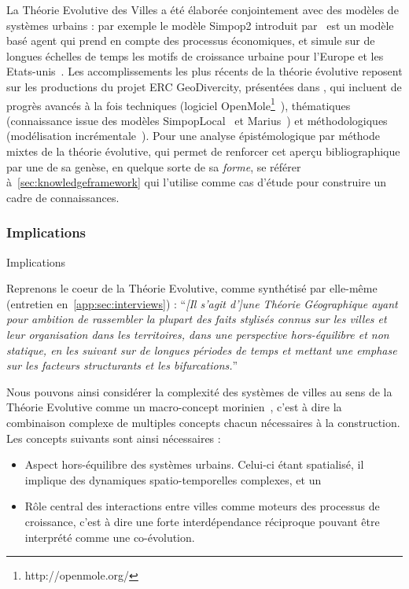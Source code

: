 La Théorie Evolutive des Villes a été élaborée conjointement avec des modèles de systèmes urbains : par exemple le modèle Simpop2 introduit par~\cite{bretagnolle2006theory} est un modèle basé agent qui prend en compte des processus économiques, et simule sur de longues échelles de temps les motifs de croissance urbaine pour l'Europe et les Etats-unis~\cite{doi:10.1177/0042098010377366}. Les accomplissements les plus récents de la théorie évolutive reposent sur les productions du projet ERC GeoDivercity, présentées dans \cite{pumain2017urban}, qui incluent de progrès avancés à la fois techniques (logiciel OpenMole\footnote{http://openmole.org/}~\cite{reuillon2013openmole}), thématiques (connaissance issue des modèles SimpopLocal~\cite{schmitt2014modelisation} et Marius~\cite{cottineau2014evolution}) et méthodologiques (modélisation incrémentale~\cite{cottineau2015incremental}). Pour une analyse épistémologique par méthode mixtes de la théorie évolutive, qui permet de renforcer cet aperçu bibliographique par une de sa genèse, en quelque sorte de sa \emph{forme}, se référer à~\ref{sec:knowledgeframework} qui l'utilise comme cas d'étude pour construire un cadre de connaissances.



\subsubsection*{Implications}{Implications}


Reprenons le coeur de la Théorie Evolutive, comme synthétisé par  elle-même (entretien en~\ref{app:sec:interviews}) : ``\textit{[Il s'agit d']une Théorie Géographique ayant pour ambition de rassembler la plupart des faits stylisés connus sur les villes et leur organisation dans les territoires, dans une perspective hors-équilibre et non statique, en les suivant sur de longues périodes de temps et mettant une emphase sur les facteurs structurants et les bifurcations.}''


Nous pouvons ainsi considérer la complexité des systèmes de villes au sens de la Théorie Evolutive comme un macro-concept morinien~\cite{morin1976methode}, c'est à dire la combinaison complexe de multiples concepts chacun nécessaires à la construction. Les concepts suivants sont ainsi nécessaires :
\begin{itemize}
	\item Aspect hors-équilibre des systèmes urbains. Celui-ci étant spatialisé, il implique des dynamiques spatio-temporelles complexes, et un 
	\item Rôle central des interactions entre villes comme moteurs des processus de croissance, c'est à dire une forte interdépendance réciproque pouvant être interprété comme une co-évolution.
\end{itemize}











